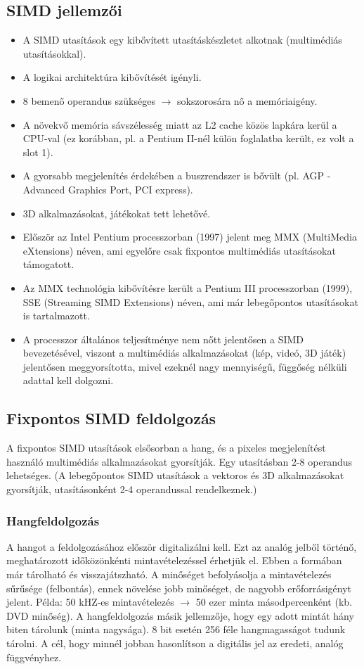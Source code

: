 \subsection{SIMD jellemzői}
\begin{itemize}
    \item A SIMD utasítások egy kibővített utasításkészletet alkotnak (multimédiás utasításokkal).
    \item A logikai architektúra kibővítését igényli.
    \item 8 bemenő operandus szükséges $\rightarrow$ sokszorosára nő a memóriaigény.
    \item A növekvő memória sávszélesség miatt az L2 cache közös lapkára kerül a CPU-val (ez korábban, pl. a Pentium II-nél külön foglalatba került, ez volt a slot 1).
    \item A gyorsabb megjelenítés érdekében a buszrendszer is bővült (pl. AGP - Advanced Graphics Port, PCI express).
    \item 3D alkalmazásokat, játékokat tett lehetővé.
    \item Először az Intel Pentium processzorban (1997) jelent meg MMX (MultiMedia eXtensions) néven, ami egyelőre csak fixpontos multimédiás utasításokat támogatott.
    \item Az MMX technológia kibővítésre került a Pentium III processzorban (1999), SSE (Streaming SIMD Extensions) néven, ami már lebegőpontos utasításokat is tartalmazott.
    \item A processzor általános teljesítménye nem nőtt jelentősen a SIMD bevezetésével, viszont a multimédiás alkalmazásokat (kép, videó, 3D játék) jelentősen meggyorsította, mivel ezeknél nagy mennyiségű, függőség nélküli adattal kell dolgozni.
\end{itemize}

\subsection{Fixpontos SIMD feldolgozás}
A fixpontos SIMD utasítások elsősorban a hang, és a pixeles megjelenítést használó multimédiás alkalmazásokat gyorsítják.
Egy utasításban 2-8 operandus lehetséges.
(A lebegőpontos SIMD utasítások a vektoros és 3D alkalmazásokat gyorsítják, utasításonként 2-4 operandussal rendelkeznek.)
\subsubsection{Hangfeldolgozás}
A hangot a feldolgozásához először digitalizálni kell.
Ezt az analóg jelből történő, meghatározott időközönkénti mintavételezéssel érhetjük el.
Ebben a formában már tárolható és visszajátszható.
A minőséget befolyásolja a mintavételezés sűrűsége (felbontás), ennek növelése jobb minőséget, de nagyobb erőforrásigényt jelent.
Példa: 50 kHZ-es mintavételezés $\rightarrow$ 50 ezer minta másodpercenként (kb. DVD minőség).
A hangfeldolgozás másik jellemzője, hogy egy adott mintát hány biten tárolunk (minta nagysága).
8 bit esetén 256 féle hangmagasságot tudunk tárolni.
A cél, hogy minnél jobban hasonlítson a digitális jel az eredeti, analóg függvényhez.
